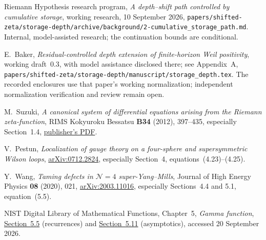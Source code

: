 Riemann Hypothesis research program,
\emph{A depth--shift path controlled by cumulative storage},
working research, 10 September 2026,
\nolinkurl{papers/shifted-zeta/storage-depth/archive/background/2-cumulative_storage_path.md}.
Internal, model-assisted research; the continuation bounds are
conditional.

E.~Baker, \emph{Residual-controlled depth extension of finite-horizon
Weil positivity}, working draft~0.3, with model assistance disclosed
there; see Appendix~A,
\nolinkurl{papers/shifted-zeta/storage-depth/manuscript/storage_depth.tex}.
The recorded enclosures use that paper's working normalization;
independent normalization verification and review remain open.

M.~Suzuki, \emph{A canonical system of differential equations arising
from the Riemann zeta-function}, RIMS Kokyuroku Bessatsu
\textbf{B34} (2012), 397--435, especially Section~1.4,
\href{https://www.kurims.kyoto-u.ac.jp/~kenkyubu/bessatsu/open/B34/pdf/B34_023.pdf}{publisher's PDF}.


V.~Pestun, \emph{Localization of gauge theory on a four-sphere and
supersymmetric Wilson loops},
\href{https://arxiv.org/abs/0712.2824}{arXiv:0712.2824},
especially Section~4, equations~(4.23)--(4.25).

Y.~Wang, \emph{Taming defects in $\mathcal N=4$ super-Yang--Mills},
Journal of High Energy Physics \textbf{08} (2020), 021,
\href{https://arxiv.org/abs/2003.11016}{arXiv:2003.11016},
especially Sections~4.4 and 5.1, equation~(5.5).

NIST Digital Library of Mathematical Functions,
Chapter~5, \emph{Gamma function},
\href{https://dlmf.nist.gov/5.5}{Section~5.5} (recurrences) and
\href{https://dlmf.nist.gov/5.11}{Section~5.11} (asymptotics),
accessed 20 September 2026.
